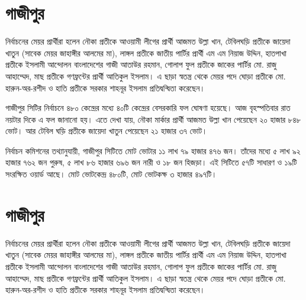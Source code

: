 \documentclass{book}
\begin{document}
\section{গাজীপুর}
নির্বাচনের মেয়র প্রার্থীরা হলেন নৌকা প্রতীকে আওয়ামী লীগের প্রার্থী আজমত উল্লা খান, টেবিলঘড়ি প্রতীকে জায়েদা খাতুন (সাবেক মেয়র জাহাঙ্গীর আলমের মা), লাঙ্গল প্রতীকে জাতীয় পার্টির প্রার্থী এম এম নিয়াজ উদ্দিন, হাতপাখা প্রতীকে ইসলামী আন্দোলন বাংলাদেশের গাজী আতাউর রহমান, গোলাপ ফুল প্রতীকে জাকের পার্টির মো. রাজু আহাম্মেদ, মাছ প্রতীকে গণফ্রন্টের প্রার্থী আতিকুল ইসলাম। এ ছাড়া স্বতন্ত্র থেকে মেয়র পদে ঘোড়া প্রতীকে মো. হারুন-অর-রশীদ ও হাতি প্রতীকে সরকার শাহনূর ইসলাম প্রতিদ্বন্দ্বিতা করেছেন।

গাজীপুর সিটির নির্বাচনে ৪৮০ কেন্দ্রের মধ্যে ৪০টি কেন্দ্রের বেসরকারি ফল ঘোষণা হয়েছে। আজ বৃহস্পতিবার রাত নয়টার দিকে এ ফল জানানো হয়। এতে দেখা যায়, নৌকা মার্কার প্রার্থী আজমত উল্লা খান পেয়েছেন ২০ হাজার ৮৪৮ ভোট। আর টেবিল ঘড়ি প্রতীকে জায়েদা খাতুন পেয়েছেন ২১ হাজার ৩৭ ভোট। 

নির্বাচন কমিশনের তথ্যানুযায়ী, গাজীপুর সিটিতে মোট ভোটার ১১ লাখ ৭৯ হাজার ৪৭৬ জন। তাঁদের মধ্যে ৫ লাখ ৯২ হাজার ৭৬২ জন পুরুষ, ৫ লাখ ৮৬ হাজার ৬৯৬ জন নারী ও ১৮ জন হিজড়া। এই সিটিতে ৫৭টি সাধারণ ও ১৯টি সংরক্ষিত ওয়ার্ড আছে। মোট ভোটকেন্দ্র ৪৮০টি, মোট ভোটকক্ষ ৩ হাজার ৪৯৭টি।

\section{গাজীপুর}
নির্বাচনের মেয়র প্রার্থীরা হলেন নৌকা প্রতীকে আওয়ামী লীগের প্রার্থী আজমত উল্লা খান, টেবিলঘড়ি প্রতীকে জায়েদা খাতুন (সাবেক মেয়র জাহাঙ্গীর আলমের মা), লাঙ্গল প্রতীকে জাতীয় পার্টির প্রার্থী এম এম নিয়াজ উদ্দিন, হাতপাখা প্রতীকে ইসলামী আন্দোলন বাংলাদেশের গাজী আতাউর রহমান, গোলাপ ফুল প্রতীকে জাকের পার্টির মো. রাজু আহাম্মেদ, মাছ প্রতীকে গণফ্রন্টের প্রার্থী আতিকুল ইসলাম। এ ছাড়া স্বতন্ত্র থেকে মেয়র পদে ঘোড়া প্রতীকে মো. হারুন-অর-রশীদ ও হাতি প্রতীকে সরকার শাহনূর ইসলাম প্রতিদ্বন্দ্বিতা করেছেন।
\end{document}
